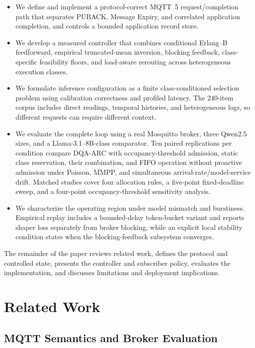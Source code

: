\documentclass[journal]{IEEEtran}
\newcommand{\method}{DQA-ARC}
\begin{document}
\begin{itemize}
  \item We define and implement a protocol-correct MQTT~5 request/completion path that separates PUBACK, Message Expiry, and correlated application completion, and controls a bounded application record store.
  \item We develop a measured controller that combines conditional Erlang--B feedforward, empirical truncated-mean inversion, blocking feedback, class-specific feasibility floors, and load-aware rerouting across heterogeneous execution classes.
  \item We formulate inference configuration as a finite class-conditioned selection problem using calibration correctness and profiled latency. The 240-item corpus includes direct readings, temporal histories, and heterogeneous logs, so different requests can require different context.
  \item We evaluate the complete loop using a real Mosquitto broker, three Qwen2.5 sizes, and a Llama-3.1--8B-class comparator. Ten paired replications per condition compare \method{} with occupancy-threshold admission, static class reservation, their combination, and FIFO operation without proactive admission under Poisson, MMPP, and simultaneous arrival-rate/model-service drift. Matched studies cover four allocation rules, a five-point fixed-deadline sweep, and a four-point occupancy-threshold sensitivity analysis.
  \item We characterize the operating region under model mismatch and burstiness. Empirical replay includes a bounded-delay token-bucket variant and reports shaper loss separately from broker blocking, while an explicit local stability condition states when the blocking-feedback subsystem converges.
\end{itemize}

The remainder of the paper reviews related work, defines the protocol and controlled state, presents the controller and subscriber policy, evaluates the implementation, and discusses limitations and deployment implications.
\section{Related Work}
\label{sec:related}

\subsection{MQTT Semantics and Broker Evaluation}
\end{document}
